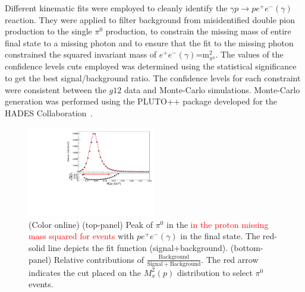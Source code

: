 \documentclass[aps,prc,twocolumn,floatfix,showpacs,preprintnumbers,amsmath,amssymb,superscriptaddress,linenumbers]{revtex4-1}
\def\pizT{$\pi^{0} \ $}
\begin{document}
Different kinematic fits were employed to cleanly identify the 
$\gamma p\rightarrow pe^+e^-(\gamma)$ reaction. They were applied 
to filter background from misidentified double pion production to 
the single $\pi^0$ production, to constrain the missing mass of entire 
final state to a missing photon and to ensure that the fit to the missing 
photon constrained the squared invariant 
mass of $e^+e^-(\gamma)$=m$^2_{\pi^0}$. The values of the confidence levels cuts employed was 
determined using the statistical significance to get the best signal/background ratio.
The confidence levels for each constraint were consistent 
between the $g12$ data and Monte-Carlo simulations. 
Monte-Carlo generation was performed using the PLUTO++ package 
developed for the HADES Collaboration~\cite{PLUTO}.
\begin{figure}[htb!]
\centerline{
        \includegraphics[height=0.35\textwidth,width=0.5\textwidth]{G12_Pi0_wBck.pdf}}

        \caption {(Color online) (top-panel) Peak of $\pi^0$ in the \textcolor{red}{in the proton missing mass squared for events} 
        	with $pe^+e^-(\gamma)$ in the final state.
        The red-solid line depicts the fit function (signal+background).
        (bottom-panel) Relative contributions of $\frac{\mathrm{Background}}
        {\mathrm{Signal + Background}}$. The red arrow indicates the cut
        placed on the $M_x^2(p)$ distribution to select \pizT events.}
        \label{fig:pi0_peak}
\end{figure}
\end{document}
